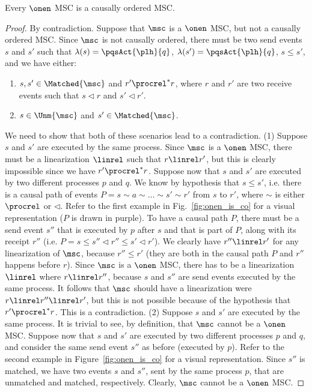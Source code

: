 
\begin{proposition}%
	Every $\onen$ MSC is a causally ordered MSC.
\end{proposition}
\begin{proof}
By contradiction. Suppose that $\msc$ is a $\onen$ MSC, but not a causally ordered MSC. Since $\msc$ is not causally ordered, there must be two send events $s$ and $s'$ such that $\lambda(s)=\pqsAct{\plh}{q}$, $\lambda(s')=\pqsAct{\plh}{q}$, $s \le s'$, and we have either:
\begin{enumerate}\itemsep=0.5ex
	\item $s,s' \in \Matched{\msc}$ and $r' \procrel^* r$, where $r$ and $r'$ are two receive events such that $s \lhd r$ and $s' \lhd r'$.
	\item  $s \in \Unm{\msc}$ and $s' \in \Matched{\msc}$.
\end{enumerate}
We need to show that both of these scenarios lead to a contradiction. (1) Suppose $s$ and $s'$ are executed by the same process. Since $\msc$ is a $\onen$ MSC, there must be a linearization $\linrel$ such that $r \linrel r'$, but this is clearly impossible since we have $r' \procrel^* r$. Suppose now that $s$ and $s'$ are executed by two different processes $p$ and $q$. We know by hypothesis that $s \le s'$, i.e. there is a causal path of events $P = s \sim a \sim \dots \sim s' \sim r'$ from $s$ to $r'$, where $\sim$ is either $\procrel$ or $\lhd$. Refer to the first example in Fig.~\ref{fig:onen_is_co} for a visual representation ($P$ is drawn in purple). To have a causal path $P$, there must be a send event $s''$ that is executed by $p$ after $s$ and that is part of $P$, along with its receipt $r''$ (i.e. $P = s \le s'' \lhd r'' \le s' \lhd r'$). We clearly have $r'' \linrel r'$ for any linearization of $\msc$, because $r'' \le r'$ (they are both in the causal path $P$ and $r''$ happens before $r$). Since $\msc$ is a $\onen$ MSC, there has to be a linearization $\linrel$ where $r \linrel r''$, because $s$ and $s''$ are send events executed by the same process. It follows that $\msc$ should have a linearization were $r \linrel r'' \linrel r'$, but this is not possible because of the hypothesis that $r' \procrel^* r$. This is a contradiction. (2) Suppose $s$ and $s'$ are executed by the same process. It is trivial to see, by definition, that $\msc$ cannot be a $\onen$ MSC. Suppose now that $s$ and $s'$ are executed by two different processes $p$ and $q$, and consider the same send event $s''$ as before (executed by $p$). Refer to the second example in Figure~\ref{fig:onen_is_co} for a visual representation. Since $s''$ is matched, we have two events $s$ and $s''$, sent by the same process $p$, that are unmatched and matched, respectively. Clearly, $\msc$ cannot be a $\onen$ MSC.
\end{proof}

